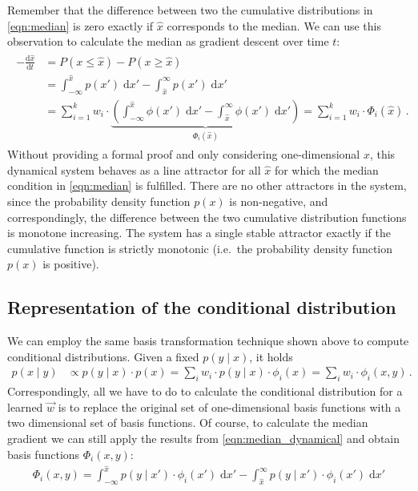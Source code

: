 \documentclass[a4paper,11pt]{article}
\begin{document}
Remember that the difference between two the cumulative distributions in \cref{eqn:median} is zero exactly if $\hat x$ corresponds to the median. We can use this observation to calculate the median as gradient descent over time $t$:
\begin{align}
    \begin{aligned}
       -\frac{\mathrm{d} \hat x}{\mathrm{d}t}
    &= P(x \leq \hat x) - P(x \geq \hat x) \\
    &= \int_{-\infty}^{\hat{x}} p(x') \; \mathrm{d}x' - \int_{\hat{x}}^{\infty} p(x') \; \mathrm{d}x' \\
    &= \sum_{i=1}^k w_i \cdot \underbrace{\left(
        \int_{-\infty}^{\hat{x}} \phi(x') \; \mathrm{d}x' -
        \int_{\hat{x}}^{\infty} \phi(x') \; \mathrm{d}x'
       \right)}_{\Phi_i(\hat x)}
     = \sum_{i=1}^k w_i \cdot \Phi_i(\hat x) \,.
    \end{aligned}
    \label{eqn:median_dynamical}
\end{align}
Without providing a formal proof and only considering one-dimensional $x$, this dynamical system behaves as a line attractor for all $\hat x$ for which the median condition in \cref{eqn:median} is fulfilled. There are no other attractors in the system, since the probability density function $p(x)$ is non-negative, and correspondingly, the difference between the two cumulative distribution functions is monotone increasing. The system has a single stable attractor exactly if the cumulative function is strictly monotonic (i.e.~the probability density function $p(x)$ is positive).

\subsection{Representation of the conditional distribution}
\label{sec:conditional}

We can employ the same basis transformation technique shown above to compute conditional distributions. Given a fixed $p(y \mid x)$, it holds
\begin{align}
	p(x \mid y)
	&\propto p(y \mid x) \cdot p(x)
	 =       \sum_i w_i \cdot p(y \mid x) \cdot \phi_i(x)
	 =       \sum_i w_i \cdot \phi_i(x, y) \,.
	\label{eqn:conditional}
\end{align}
Correspondingly, all we have to do to calculate the conditional distribution for a learned $\vec w$ is to replace the original set of one-dimensional basis functions with a two dimensional set of basis functions. Of course, to calculate the median gradient we can still apply the results from \cref{eqn:median_dynamical} and obtain basis functions $\Phi_i(x, y)$:
\begin{align}
    \Phi_i(x, y) =
        \int_{-\infty}^{\hat{x}}
            p(y \mid x') \cdot \phi_i(x') \; \mathrm{d}x' -
        \int_{\hat{x}}^{\infty}
            p(y \mid x') \cdot \phi_i(x') \; \mathrm{d}x'
    \label{eqn:median_gradient_basis}
\end{align}
\end{document}
